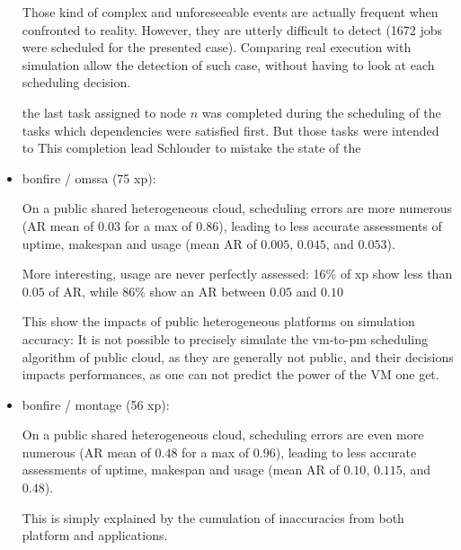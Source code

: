 \documentclass[a4paper,10pt]{article}
\newcommand\vrpath{../../lab/setup/simschlouder/validation-results/}
\begin{document}
\begin{itemize}
      Those kind of complex and unforeseeable events are actually frequent 
      when confronted to reality. However, they are utterly difficult to detect
      (1672 jobs were scheduled for the presented case).
      Comparing real execution with simulation allow the detection of such case, 
      without having to look at each scheduling decision.
      
      the last task assigned to node $n$ was 
      completed during the scheduling of the tasks which dependencies were satisfied 
      first. But those tasks were intended to 
      This completion lead 
      Schlouder to mistake the state of the 
      
      
 
 \item bonfire / omssa (75 xp): 
 
      
      
      
      
      On a public shared heterogeneous cloud, scheduling errors are more numerous 
      (AR mean of $0.03$ for a max of $0.86$), leading to less accurate assessments
      of uptime, makespan and usage (mean AR of $0.005$, $0.045$, and $0.053$).

      More interesting, usage are never perfectly assessed: 
      16\% of xp show less than $0.05$ of AR, 
      while 86\% show an AR between $0.05$ and $0.10$
      
      This show the impacts of public heterogeneous platforms on simulation
      accuracy: 
      It is not possible to precisely simulate the vm-to-pm scheduling algorithm of 
      public cloud, as they are generally not public, and their decisions impacts 
      performances, as one can not predict the power of the VM one get.
 
 \item bonfire / montage (56 xp): 
 
      
      
      
 
      On a public shared heterogeneous cloud, scheduling errors are even more numerous 
      (AR mean of $0.48$ for a max of $0.96$), leading to less accurate assessments
      of uptime, makespan and usage (mean AR of $0.10$, $0.115$, and $0.48$).
      
      This is simply explained by the cumulation of inaccuracies from 
      both platform and applications. 
\end{itemize}
\end{document}
